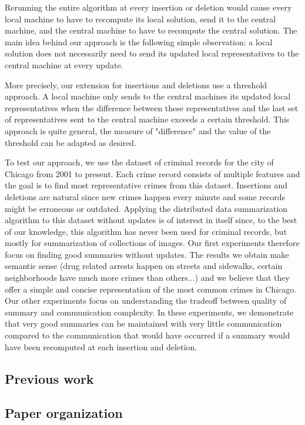 	Rerunning the entire algorithm at every insertion or deletion would cause every local machine to have to recompute its local solution, send it to the central machine, and the central machine to have to recompute the central solution. The main idea behind our approach is the following simple observation: a local solution does not necessarily need to send its updated local representatives to the central machine at every update.
	
	More precisely, our extension for insertions and deletions use a threshold approach. A local machine only sends to the central machines its updated local representatives when the difference between these representatives and the last set of representatives sent to the central machine exceeds a certain threshold. This approach is quite general, the measure of "difference" and the value of the threshold can be adapted as desired.
	
	To test our approach, we use the dataset of criminal records for the city of Chicago from 2001 to present. Each crime record consists of multiple features and the goal is to find most representative crimes from this dataset. Insertions and deletions are natural since new crimes happen every minute and some records might be erroneous or outdated. Applying the distributed data summarization algorithm to this dataset without updates is of interest in itself since, to the best of our knowledge, this algorithm has never been used for criminal records, but mostly for summarization of collections of images. Our first experiments therefore focus on finding good summaries without updates. The results we obtain make semantic sense (drug related arrests happen on streets and sidewalks, certain neighborhoods have much more crimes than others...) and we believe that they offer a simple and concise representation of the most common crimes in Chicago. Our other experiments focus on understanding the tradeoff between quality of summary and communication complexity. In these experiments, we demonstrate that very good summaries can be maintained with very little communication compared to the communication that would have occurred if a summary would have been recomputed at each insertion and deletion.
	
	\subsection{Previous work}
	
	\subsection{Paper organization}